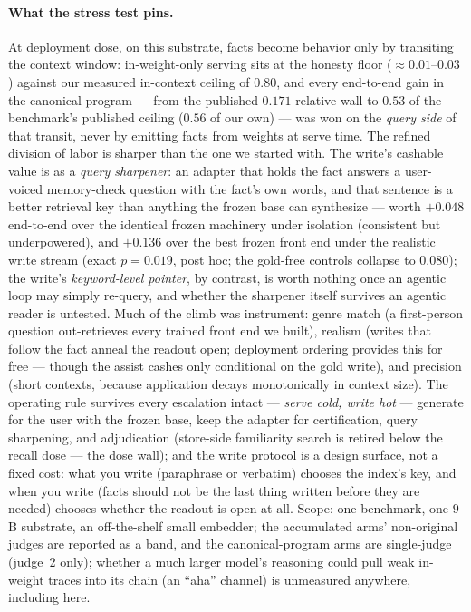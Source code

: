 \documentclass[11pt]{article}
\begin{document}
\paragraph{What the stress test pins.} At deployment dose, on this substrate, facts become
behavior only by transiting the context window: in-weight-only serving sits at the honesty
floor ($\approx 0.01$--$0.03$) against our measured in-context ceiling of $0.80$, and every
end-to-end gain in the canonical program --- from the published $0.171$ relative wall to
$0.53$ of the benchmark's published ceiling ($0.56$ of our own) --- was won on the
\emph{query side} of that transit, never by emitting facts from
weights at serve time. The refined division of labor is sharper than the one we started
with. The write's cashable value is as a \emph{query sharpener}: an adapter that holds the
fact answers a user-voiced memory-check question with the fact's own words, and that
sentence is a better retrieval key than anything the frozen base can synthesize --- worth
$+0.048$ end-to-end over the identical frozen machinery under isolation (consistent but
underpowered), and $+0.136$ over the best frozen front end under the realistic write
stream (exact $p{=}0.019$, post hoc; the gold-free controls collapse to $0.080$);
the write's \emph{keyword-level pointer}, by contrast, is worth nothing once an agentic
loop may simply re-query, and whether the sharpener itself survives an agentic reader is
untested. Much of the climb was
instrument: genre match (a first-person question out-retrieves every trained front end we
built), realism (writes that follow the fact anneal the readout open; deployment ordering
provides this for free --- though the assist cashes only conditional on the gold write),
and precision (short contexts, because application decays
monotonically in context size). The operating rule survives every escalation intact ---
\emph{serve cold, write hot} --- generate for the user with the frozen base, keep the
adapter for certification, query sharpening, and adjudication (store-side familiarity
search is retired below the recall dose --- the dose wall); and the write protocol is a
design surface, not a fixed cost: what you write (paraphrase or verbatim) chooses the
index's key, and when you write (facts should not be the last thing written before they
are needed) chooses whether the readout is open at all.
Scope: one benchmark, one $9$B substrate, an off-the-shelf small embedder; the accumulated
arms' non-original judges are reported as a band, and the canonical-program arms are
single-judge (judge~2 only); whether a much larger model's reasoning could pull weak
in-weight traces into its chain (an ``aha'' channel) is unmeasured anywhere, including
here.
\end{document}
